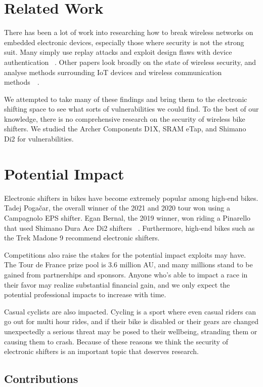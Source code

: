 \documentclass[letterpaper,twocolumn,10pt]{article}
\begin{document}
\section{Related Work}

There has been a lot of work into researching how to break wireless networks on embedded electronic devices, especially those where security is not the strong suit. Many simply use replay attacks and exploit design flaws with device authentication~ \cite{Halperin}. Other papers look broadly on the state of wireless security, and analyse methods surrounding IoT devices and wireless communication methods~\cite{Choi}~\cite{Radek}.

We attempted to take many of these findings and bring them to the electronic shifting space to see what sorts of vulnerabilities we could find. To the best of our knowledge, there is no comprehensive research on the security of wireless bike shifters. We studied the Archer Components D1X, SRAM eTap, and Shimano Di2 for vulnerabilities.

\section{Potential Impact}

Electronic shifters in bikes have become extremely popular among high-end bikes. Tadej Pogačar, the overall winner of the 2021 and 2020 tour won using a Campagnolo EPS shifter. Egan Bernal, the 2019 winner, won riding a Pinarello that used Shimano Dura Ace Di2 shifters~ \cite{GCNTech}. Furthermore, high-end bikes such as the Trek Madone 9 recommend electronic shifters.

Competitions also raise the stakes for the potential impact exploits may have. The Tour de France prize pool is 3.6 million AU, and many millions stand to be gained from partnerships and sponsors. Anyone who's able to impact a race in their favor may realize substantial financial gain, and we only expect the potential professional impacts to increase with time.

Casual cyclists are also impacted. Cycling is a sport where even casual riders can go out for multi hour rides, and if their bike is disabled or their gears are changed unexpectedly a serious threat may be posed to their wellbeing, stranding them or causing them to crash. Because of these reasons we think the security of electronic shifters is an important topic that deserves research.

\subsection{Contributions}
\end{document}

